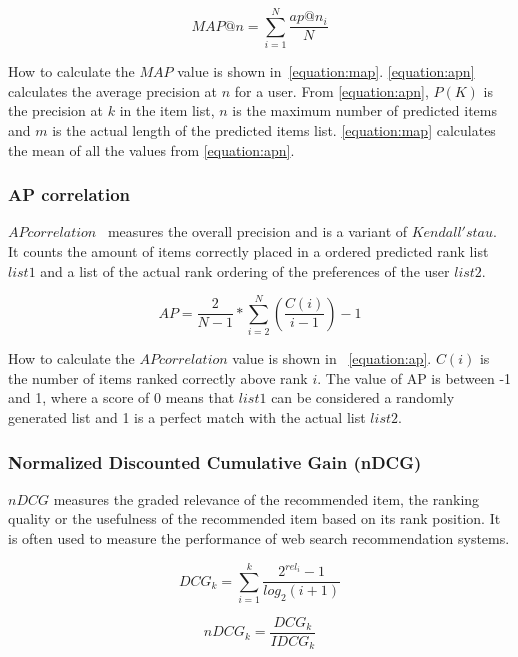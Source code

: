 \begin{equation}
	MAP@n = \sum_{i=1}^{N}{\frac{ap@n_i}{N}}
	\label{equation:map}
\end{equation}

How to calculate the $MAP$ value is shown in~\ref{equation:map}.
\ref{equation:apn} calculates the average precision at $n$ for a user.
From \ref{equation:apn}, $P(K)$ is the precision at $k$ in the item list, $n$ is the maximum number of predicted items and $m$ is the actual length of the predicted items list.
\ref{equation:map} calculates the mean of all the values from \ref{equation:apn}.


\subsubsection{AP correlation}
$AP correlation$~\cite{Yilmaz:2008:NRC:1390334.1390435} measures the overall precision and is a variant of $Kendall's tau$.
It counts the amount of items correctly placed in a ordered predicted rank list $list1$ and a list of the actual rank ordering of the preferences of the user $list2$.

\begin{equation}
	AP = \frac{2}{N - 1} * \sum_{i=2}^{N}{(\frac{C(i)}{i - 1})} - 1
	\label{equation:ap}
\end{equation}

How to calculate the $AP correlation$ value is shown in ~\ref{equation:ap}.
$C(i)$ is the number of items ranked correctly above rank $i$.
The value of AP is between -1 and 1, where a score of 0 means that $list1$ can be considered a randomly generated list and 1 is a perfect match with the actual list $list2$.


\subsubsection{Normalized Discounted Cumulative Gain (nDCG)}
$nDCG$ measures the graded relevance of the recommended item, the ranking quality or the usefulness of the recommended item based on its rank position.
It is often used to measure the performance of web search recommendation systems.

\begin{equation}
	DCG_k = \sum_{i=1}^{k}{\frac{2^{rel_i}-1}{log_2(i+1)}}
	\label{equation:dcg}
\end{equation}

\begin{equation}
	nDCG_k = \frac{DCG_k}{IDCG_k}
	\label{equation:ndcg}
\end{equation}

